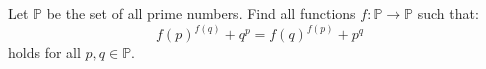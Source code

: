 Let $\mathbb{P}$ be the set of all prime numbers. Find all functions $f:\mathbb{P}\rightarrow\mathbb{P}$ such that:$$f(p)^{f(q)}+q^p=f(q)^{f(p)}+p^q$$holds for all $p,q\in\mathbb{P}$.